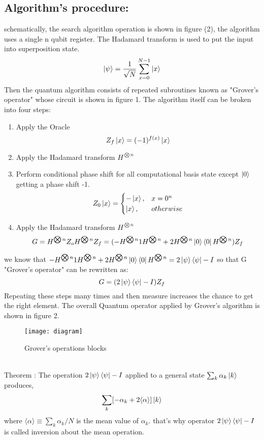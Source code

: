 \documentclass[11pt]{article}
\begin{document}
\subsection{Algorithm's procedure:}
schematically, the search algorithm operation is shown in figure (2), the algorithm uses a single n qubit register. The Hadamard transform is used to put the input into superposition state.
\begin{equation}
\ket{\psi}= \frac{1}{\sqrt N}\sum_{x=0}^{N-1}\ket{x} 
\end{equation}
Then the quantum algorithm consists of repeated subroutines known as "Grover's operator" whose circuit is shown in figure 1. The algorithm itself can be broken into four steps:\\
\begin{enumerate}
	\item Apply the Oracle
	\begin{equation}
	Z_f\ket{x} = (-1)^{f(x)}\ket{x} 
	\end{equation}
	\item Apply the Hadamard transform $H^{\bigotimes n}$
	\item  Perform conditional phase shift for all computational basis state except $\ket{0}$ getting a phase shift -1.
	\begin{equation}
	Z_0\ket{x}=\begin{cases}
	-\ket{x}, & x= 0^{n}\\
	\ket{x}, & otherwise
	\end{cases}
	\end{equation}
	\item Apply the Hadamard transform $H^{\bigotimes n}$\\
	\begin{equation}
	G = H^{\bigotimes n}Z_o H^{\bigotimes n} Z_f 
	  = (-H^{\bigotimes n}1H^{\bigotimes n}+2H^{\bigotimes n}\ket{0}\bra{0}H^{\bigotimes n}) Z_f 
	\end{equation}
	
\end{enumerate}
we know that $-H^{\bigotimes n}1H^{\bigotimes n}+2H^{\bigotimes n}\ket{0}\bra{0}H^{\bigotimes n}= 2\ket{\psi}\bra{\psi}-I $ so that G "Grover's operator" can be rewritten as:\\
\begin{equation*}
G = (2\ket{\psi}\bra{\psi}-I )Z_f
\end{equation*}
Repeating these steps many times and then measure increases the chance to get the right element. The overall Quantum operator applied by Grover's algorithm is shown in figure 2.
\begin{figure}[h]
\texttt{[image: diagram]}
\centering
\caption{Grover's operations blocks}
\end{figure}\\
Theorem : The operation $2\ket{\psi}\bra{\psi}-I$ applied to a general state $ \sum_{k}\alpha_k \ket{k}$ produces,
\begin{equation}
\sum_{k}[-\alpha_k + 2\langle\alpha\rangle]\ket{k}
\end{equation}
 where $\langle\alpha\rangle\equiv\sum_{k}\alpha_k/N$ is the mean value of $\alpha_k$. that's why operator $2\ket{\psi}\bra{\psi}-I$ is called inversion about the mean operation.  
\end{document}
